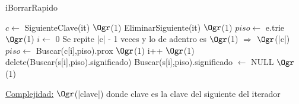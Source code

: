 \begin{Algoritmos}
	\begin{algorithm}
		\caption{iBorrarRapido}
		\begin{algorithmic}
				\State $c \gets$ SiguienteClave(it) \Comment $\Ogr$(1)
				\State EliminarSiguiente(it) \Comment $\Ogr$(1)
				\State $piso \gets$ e.trie \Comment $\Ogr$(1)
				\State $i \gets$ 0
				 \Comment Se repite |c| - 1 veces y lo de adentro es $\Ogr$(1) $\Rightarrow$ $\Ogr$(|c|)
					\State $piso \gets$ Buscar(c[i],piso).prox \Comment $\Ogr$(1)
					\State i++ \Comment $\Ogr$(1)
				\EndWhile
				\State delete(Buscar(s[i],piso).significado)
				\State Buscar(s[i],piso).significado $\gets$ NULL \Comment $\Ogr$(1)
			\EndProcedure
		\end{algorithmic}
		\underline{Complejidad:} $\Ogr$(|clave|) donde clave es la clave del siguiente del iterador
	\end{algorithm}
	
\end{Algoritmos}